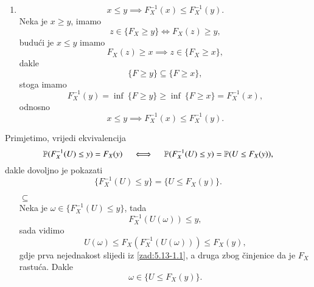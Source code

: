 \begin{rj}[\ref{zad:5.13-1}]
\begin{enumerate}[label=(\arabic*)]
        \item   \label{zad:5.13-1.3}
        \begin{equation*}
            x \leq y \implies F_X^{-1} (x) \leq F_X^{-1} (y).
        \end{equation*}
        Neka je $x \geq y$, imamo
        \begin{equation*}
            z \in \{ F_X \geq y \} \iff F_X (z) \geq y,
        \end{equation*}
        budu\' ci je $x \leq y$ imamo
        \begin{equation*}
            F_X(z) \geq x \implies z \in \{ F_X \geq x \},
        \end{equation*}
        dakle
        \begin{equation*}
            \{ F \geq y \} \subseteq \{ F \geq x \},
        \end{equation*}
        stoga imamo
        \begin{equation*}
            F_X^{-1} (y) = \inf \: \{ F \geq y \} \geq  \inf \: \{ F \geq x \} = F_X^{-1} (x),
        \end{equation*}
        odnosno
        \begin{equation*}
            x \leq y \implies F_X^{-1} (x) \leq F_X^{-1} (y).
        \end{equation*}
    \end{enumerate}

    Primjetimo, vrijedi ekvivalencija
    \begin{equation*}
        \mathbb{P} (F_X^{-1} (U) \leq y) = F_X (y) \quad \iff \quad \mathbb{P} (F_X^{-1} (U) \leq y) = \mathbb{P} ( U \leq F_X (y) ),
    \end{equation*}
    dakle dovoljno je pokazati
    \begin{equation*}
        \{ F_X^{-1} (U) \leq y \} = \{ U \leq F_X(y) \}.
    \end{equation*}
    \begin{itemize}
        \item[$\subseteq$]
        \quad \\ 
        Neka je $\omega \in \{ F_X^{-1} (U) \leq y \}$, tada
        \begin{equation*}
            F_X^{-1} (U(\omega)) \leq y,
        \end{equation*} 
        sada vidimo
        \begin{equation*}
            U(\omega) \leq F_X(F_X^{-1} (U(\omega))) \leq F_X(y),
        \end{equation*}
        gdje prva nejednakost slijedi iz \ref{zad:5.13-1.1}, a druga zbog \v cinjenice da je $F_X$ rastu\' ca.
        Dakle
        \begin{equation*}
            \omega \in \{ U \leq F_X(y) \}.
        \end{equation*}


\end{itemize}
\end{rj}
